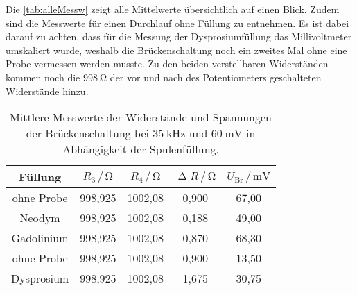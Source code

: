 \noindent
Die \autoref{tab:alleMessw} zeigt alle Mittelwerte übersichtlich auf einen Blick. Zudem sind die Messwerte für einen Durchlauf ohne Füllung zu entnehmen.
Es ist dabei darauf zu achten, dass für die Messung der Dysprosiumfüllung das Millivoltmeter umskaliert wurde, weshalb die Brückenschaltung noch ein zweites Mal ohne eine Probe vermessen werden musste.
Zu den beiden verstellbaren Widerständen kommen noch die $\SI{998}{\ohm}$ der vor und nach des Potentiometers geschalteten Widerstände hinzu.
\begin{table}[H]
  \centering
  \caption{Mittlere Messwerte der Widerstände und Spannungen der Brückenschaltung bei $\SI{35}{\kilo\hertz}$ und $\SI{60}{\milli\volt}$ in Abhängigkeit der Spulenfüllung.}
  \label{tab:alleMessw}
  \begin{tabular}{c| c c c c}
    \toprule
    Füllung & $\overline{R_3} \,/\, \si{\ohm}$ & $\overline{R_4} \,/\, \si{\ohm}$ & $\overline{\upDelta R} \,/\, \si{\ohm}$ & $\overline{U_{\text{Br}}} \,/\, \si{\milli\volt}$ \\
    \midrule
    ohne Probe & 998,925 & 1002,08 & 0,900 & 67,00 \\
    Neodym & 998,925 & 1002,08 & 0,188 & 49,00\\ 
    Gadolinium & 998,925 & 1002,08 & 0,870 & 68,30\\ \hline
    ohne Probe & 998,925 & 1002,08 & 0,900 & 13,50 \\
    Dysprosium & 998,925 & 1002,08 & 1,675 & 30,75 \\
    \bottomrule
  \end{tabular}
\end{table}

